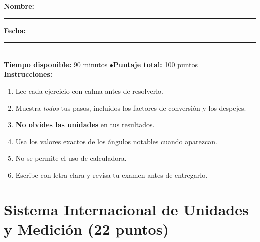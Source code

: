 \documentclass[12pt, letterpaper]{article}
\begin{document}


\vspace{4pt}
\begin{cuadroinfo}
  \small
  \textbf{Nombre:} \rule{0.55\linewidth}{0.4pt} \quad \textbf{Fecha:} \rule{0.15\linewidth}{0.4pt} \\[6pt]
  \textbf{Tiempo disponible:} 90 minutos \quad$\bullet$\quad \textbf{Puntaje total:} 100 puntos \\[4pt]
  \textbf{Instrucciones:}
  \begin{enumerate}[leftmargin=*]
    \item Lee cada ejercicio con calma antes de resolverlo.
    \item Muestra \emph{todos} tus pasos, incluidos los factores de conversión y los despejes.
    \item \textbf{No olvides las unidades} en tus resultados.
    \item Usa los valores exactos de los ángulos notables cuando aparezcan.
    \item No se permite el uso de calculadora.
    \item Escribe con letra clara y revisa tu examen antes de entregarlo.
  \end{enumerate}
\end{cuadroinfo}

\vspace{8pt}

\section{Sistema Internacional de Unidades y Medición (22 puntos)}
\end{document}

